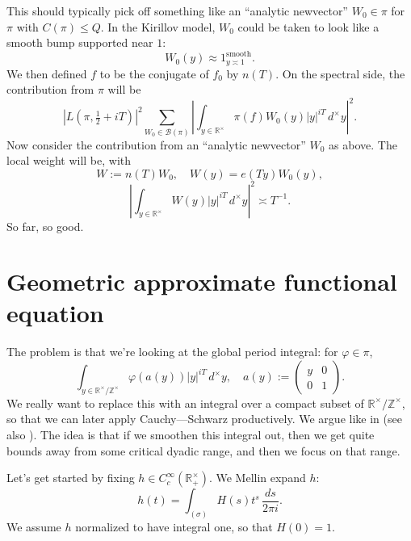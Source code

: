 \documentclass[reqno]{amsart} 
\begin{document}
This should typically pick off something like an ``analytic newvector'' $W_0 \in \pi$ for $\pi$ with $C(\pi) \leq Q$.  In the Kirillov model, $W_0$ could be taken to look like a smooth bump supported near $1$:
\begin{equation*}
  W_0(y) \approx 1_{y \asymp 1}^{\text{smooth}}.
\end{equation*}
We then defined $f$ to be the conjugate of $f_0$ by $n(T)$.  On the spectral side, the contribution from $\pi$ will be
\begin{equation*}
  \left\lvert L(\pi, \tfrac{1}{2} + i T) \right\rvert^2
  \sum _{W_0 \in \mathcal{B}(\pi)} 
  \left\lvert
    \int _{y \in \mathbb{R} ^\times }
    \pi(f) W_0(y)
    |y|^{i T}
    \, d^\times y
  \right\rvert^2.
\end{equation*}
Now consider the contribution from an ``analytic newvector'' $W_0$ as above.  The local weight will be, with
\begin{equation*}
  W := n(T) W_0, \quad W(y) = e(T y) W_0(y),
\end{equation*}
\begin{equation*}
  \left\lvert \int _{y \in \mathbb{R}^\times } W (y) |y|^{i T} \, d^\times y \right\rvert^2 \asymp T^{-1}.
\end{equation*}
So far, so good.

\section{Geometric approximate functional equation}\label{sec:20230522180027}
The problem is that we're looking at the global period integral: for $\varphi \in \pi$,
\begin{equation*}
  \int _{y \in \mathbb{R}^\times / \mathbb{Z} ^\times }
  \varphi(a(y)) |y|^{i T} \, d^\times y, \quad
  a(y) :=
  \begin{pmatrix}
    y & 0 \\
    0 & 1
  \end{pmatrix}.
\end{equation*}
We really want to replace this with an integral over a compact subset of $\mathbb{R}^\times / \mathbb{Z}^\times$, so that we can later apply Cauchy---Schwarz productively.  We argue like in \cite[\S5.1.4]{michel-2009} (see also \cite[\S5.3]{2021arXiv210915230N}).  The idea is that if we smoothen this integral out, then we get quite bounds away from some critical dyadic range, and then we focus on that range.

Let's get started by fixing $h \in C_c^\infty(\mathbb{R}^\times_+)$.  We Mellin expand $h$:
\begin{equation*}
  h(t) = \int _{(\sigma)} H(s) t^s \, \frac{d s }{ 2 \pi i}.
\end{equation*}
We assume $h$ normalized to have integral one, so that $H(0) = 1$.
\end{document}
